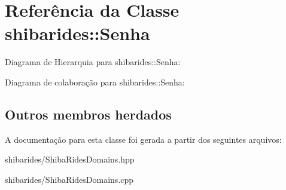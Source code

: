 \hypertarget{classshibarides_1_1Senha}{}\section{Referência da Classe shibarides\+:\+:Senha}
\label{classshibarides_1_1Senha}


Diagrama de Hierarquia para shibarides\+:\+:Senha\+:


Diagrama de colaboração para shibarides\+:\+:Senha\+:
\subsection*{Outros membros herdados}


A documentação para esta classe foi gerada a partir dos seguintes arquivos\+:\begin{DoxyCompactItemize}
\item 
shibarides/Shiba\+Rides\+Domains.\+hpp\item 
shibarides/Shiba\+Rides\+Domains.\+cpp\end{DoxyCompactItemize}
